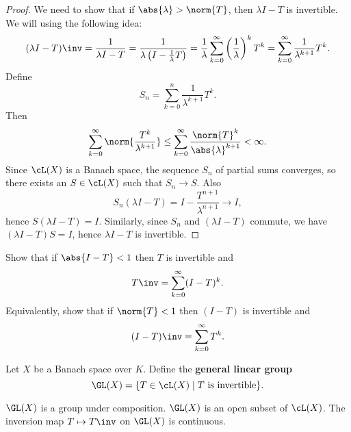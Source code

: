 \begin{proof}
  We need to show that if $\abs{\lambda}>\norm{T}$, then $\lambda I-T$ is invertible.
  We will using the following idea:
  \[ (\lambda I-T)\inv = \frac{1}{\lambda I-T} = \frac{1}{\lambda \left( I-\frac{1}{\lambda}T \right)} = \frac{1}{\lambda} \sum_{k=0}^\infty \left( \frac{1}{\lambda} \right)^k T^k = \sum_{k=0}^\infty \frac{1}{\lambda^{k+1}}T^k. \]
  Define
  \[ S_n = \sum_{k=0}^n \frac{1}{\lambda^{k+1}}T^k. \]
  Then
  \[ \sum_{k=0}^\infty \norm{ \frac{T^k}{\lambda^{k+1}} } \leq \sum_{k=0}^\infty \frac{\norm{T}^k}{\abs{\lambda}^{k+1}} < \infty. \]
  Since $\cL(X)$ is a Banach space, the sequence $S_n$ of partial sums converges, so there exists an $S \in \cL(X)$ such that $S_n \to S$.
  Also
  \[ S_n(\lambda I-T) = I - \frac{T^{n+1}}{\lambda^{n+1}} \to I, \]
  hence $S(\lambda I-T) = I$.
  Similarly, since $S_n$ and $(\lambda I-T)$ commute, we have $(\lambda I-T)S=I$, hence $\lambda I-T$ is invertible.
\end{proof}

\begin{exer}\label{18:exer}
  Show that if $\abs{I-T}<1$ then $T$ is invertible and
  \[ T\inv = \sum_{k=0}^\infty (I-T)^k. \]
  Equivalently, show that if $\norm{T}<1$ then $(I-T)$ is invertible and
  \[ (I-T)\inv = \sum_{k=0}^\infty T^k. \]
\end{exer}

\begin{defn}
  Let $X$ be a Banach space over $K$.
  Define the \textbf{general linear group}
  \[ \GL(X) = \{ T \in \cL(X) \mid T \text{ is invertible} \}. \]
\end{defn}

\begin{prop}
  \leavevmode
  \begin{enum}
    \io $\GL(X)$ is a group under composition.
    \io $\GL(X)$ is an open subset of $\cL(X)$.
    \io The inversion map $T \mapsto T\inv$ on $\GL(X)$ is continuous.
  \end{enum}
\end{prop}

